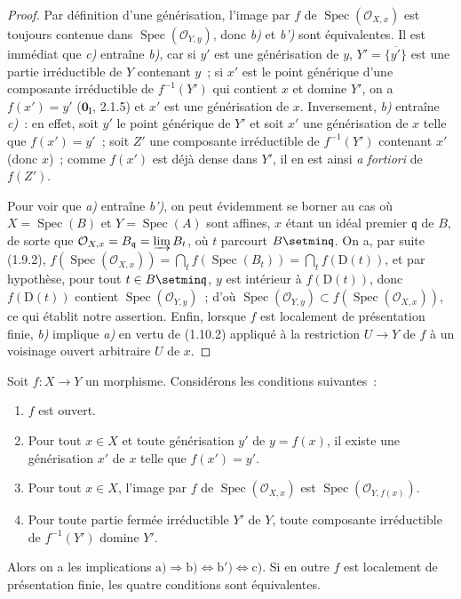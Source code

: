 \begin{proof}
Par définition d'une générisation, l'image par $f$ de
$\operatorname{Spec}(\mathcal O_{X,x})$ est toujours contenue dans
$\operatorname{Spec}(\mathcal O_{Y,y})$, donc \emph{b)} et \emph{b')} sont équivalentes. Il
est immédiat
que \emph{c)} entraîne \emph{b)}, car si $y'$ est une générisation de $y$,
$Y'=\overline{\{y'\}}$ est une partie irréductible de $Y$ contenant $y$~; si
$x'$ est le point générique d'une composante irréductible de $f^{-1}(Y')$ qui
contient $x$ et domine $Y'$, on a $f(x')=y'$ ($\mathbf{0}_{\mathrm I}$, 2.1.5) et $x'$
est une générisation de $x$. Inversement, \emph{b)} entraîne \emph{c)}~: en effet, soit
$y'$ le point générique de $Y'$ et soit $x'$ une générisation de $x$ telle
que $f(x')=y'$~; soit $Z'$ une composante irréductible de $f^{-1}(Y')$
contenant $x'$ (donc $x$)~; comme $f(x')$ est déjà dense dans $Y'$, il en est
ainsi \emph{a fortiori} de $f(Z')$.

Pour voir que \emph{a)} entraîne \emph{b')}, on peut évidemment se borner au cas où
$X=\operatorname{Spec}(B)$ et $Y=\operatorname{Spec}(A)$ sont affines, $x$
étant un idéal premier
$\mathfrak q$ de $B$, de sorte que
$\mathcal O_{X,x}=B_{\mathfrak q}=\varinjlim B_t$,
où $t$ parcourt $B\setmin\mathfrak q$. On a, par suite (1.9.2),
$f(\operatorname{Spec}(\mathcal O_{X,x}))
=\bigcap_t f(\operatorname{Spec}(B_t))=\bigcap_t f(\mathrm D(t))$,
et par hypothèse, pour tout $t\in B\setmin\mathfrak q$, $y$ est intérieur à
$f(\mathrm D(t))$, donc $f(\mathrm D(t))$ contient
$\operatorname{Spec}(\mathcal O_{Y,y})$~; d'où
$\operatorname{Spec}(\mathcal O_{Y,y})
\subset f(\operatorname{Spec}(\mathcal O_{X,x}))$, ce qui établit
notre assertion. Enfin, lorsque $f$ est localement de présentation finie, \emph{b)}
implique \emph{a)} en vertu de (1.10.2) appliqué à la restriction $U\to Y$ de $f$ à
un voisinage ouvert arbitraire $U$ de $x$.
\end{proof}

\begin{corollary}[1.10.4]
\label{IV.1.10.4-fr}
Soit $f:X\to Y$ un morphisme. Considérons les conditions suivantes~:
\begin{enumerate}
  \item[\textup{a)}] $f$ est ouvert.
  \item[\textup{b)}] Pour tout $x\in X$ et toute générisation $y'$ de $y=f(x)$, il
  existe une générisation $x'$ de $x$ telle que $f(x')=y'$.
  \item[\textup{b')}] Pour tout $x\in X$, l'image par $f$ de
  $\operatorname{Spec}(\mathcal O_{X,x})$ est
  $\operatorname{Spec}(\mathcal O_{Y,f(x)})$.
  \item[\textup{c)}] Pour toute partie fermée irréductible $Y'$ de $Y$, toute
  composante irréductible de $f^{-1}(Y')$ domine $Y'$.
\end{enumerate}
Alors on a les implications
$\mathrm{a)}\Rightarrow\mathrm{b)}\Leftrightarrow\mathrm{b')}
\Leftrightarrow\mathrm{c)}$. Si en outre $f$ est localement de présentation
finie, les quatre conditions sont équivalentes.
\end{corollary}

